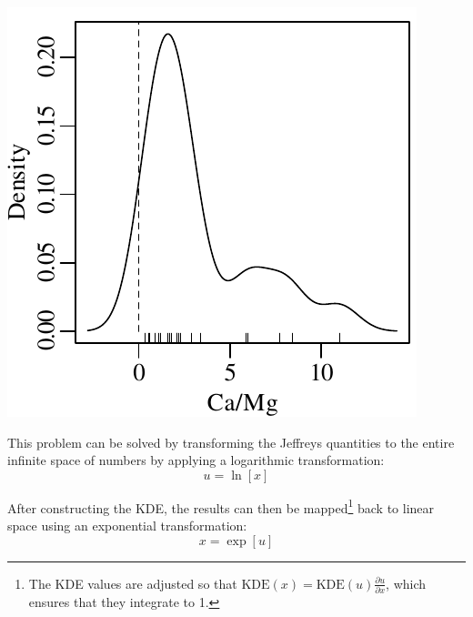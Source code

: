 \noindent\begin{minipage}[t][][b]{.3\textwidth}
  \includegraphics[width=\textwidth]{../figures/negativeKDE.pdf}\medskip
\end{minipage}
\begin{minipage}[t][][t]{.7\textwidth}
  \label{fig:negativeKDE}
\end{minipage}

This problem can be solved by transforming the Jeffreys quantities to
the entire infinite space of numbers by applying a logarithmic
transformation:
\begin{equation}
  u = \ln[x]
\end{equation}

After constructing the KDE, the results can then be
mapped\footnote{The KDE values are adjusted so that $\mbox{KDE}(x) =
\mbox{KDE}(u)\frac{\partial{u}}{\partial{x}}$, which ensures that they
integrate to 1.} back to linear space using an exponential
transformation:
\begin{equation}
  x = \exp[u]
\end{equation}

